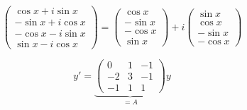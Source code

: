 \documentclass{article}
\begin{document}
\begin{beispiele}
\[\begin{pmatrix}
\cos x + i \sin x\\
-\sin x + i \cos x \\
-\cos x - i \sin x\\
\sin x - i \cos x
\end{pmatrix} = 
\begin{pmatrix}
\cos x \\
-\sin x\\
-\cos x\\
\sin x
\end{pmatrix} + i
\begin{pmatrix}
\sin x\\
\cos x\\
-\sin x\\
-\cos x
\end{pmatrix}
\]

\item 
\[ y' = \underbrace{
\begin{pmatrix}
0&1&-1\\
-2&3&-1\\
-1&1&1
\end{pmatrix}}_{=A} y \]


\end{beispiele}
\end{document}
